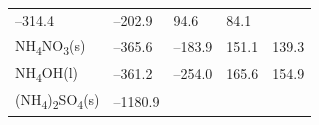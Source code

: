 \documentclass[
  9pt,
]{extbook}
\theoremstyle{definition}
\theoremstyle{definition}
\theoremstyle{definition}
\theoremstyle{remark}
\begin{document}
\begin{longtable}[]{@{}lllll@{}}
\begin{minipage}[t]{0.19\columnwidth}
--314.4\strut
\end{minipage} & \begin{minipage}[t]{0.20\columnwidth}\raggedright
--202.9\strut
\end{minipage} & \begin{minipage}[t]{0.18\columnwidth}\raggedright
94.6\strut
\end{minipage} & \begin{minipage}[t]{0.18\columnwidth}\raggedright
84.1\strut
\end{minipage}\tabularnewline
\begin{minipage}[t]{0.10\columnwidth}\raggedright
NH\textsubscript{4}NO\textsubscript{3}(s)\strut
\end{minipage} & \begin{minipage}[t]{0.19\columnwidth}\raggedright
--365.6\strut
\end{minipage} & \begin{minipage}[t]{0.20\columnwidth}\raggedright
--183.9\strut
\end{minipage} & \begin{minipage}[t]{0.18\columnwidth}\raggedright
151.1\strut
\end{minipage} & \begin{minipage}[t]{0.18\columnwidth}\raggedright
139.3\strut
\end{minipage}\tabularnewline
\begin{minipage}[t]{0.10\columnwidth}\raggedright
NH\textsubscript{4}OH(l)\strut
\end{minipage} & \begin{minipage}[t]{0.19\columnwidth}\raggedright
--361.2\strut
\end{minipage} & \begin{minipage}[t]{0.20\columnwidth}\raggedright
--254.0\strut
\end{minipage} & \begin{minipage}[t]{0.18\columnwidth}\raggedright
165.6\strut
\end{minipage} & \begin{minipage}[t]{0.18\columnwidth}\raggedright
154.9\strut
\end{minipage}\tabularnewline
\begin{minipage}[t]{0.10\columnwidth}\raggedright
(NH\textsubscript{4})\textsubscript{2}SO\textsubscript{4}(s)\strut
\end{minipage} & \begin{minipage}[t]{0.19\columnwidth}\raggedright
--1180.9\strut
\end{minipage} & \begin{minipage}[t]{0.20\columnwidth}\raggedright

\end{minipage}
\end{longtable}
\end{document}
